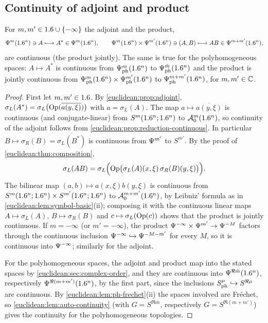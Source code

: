 \subsection{Continuity of adjoint and product}

\begin{proposition}\label{euclidean:prop:continuity}
  For $m,m'\in1.6\cup\{-\infty\}$ the adjoint and the product,
  \begin{equation*}
    \Psi^{m}(1.6^n)\ni A\longmapsto A^*\in\Psi^{m}(1.6^n),\qquad
    \Psi^{m}(1.6^n)\times\Psi^{m'}(1.6^n)\ni(A,B)\longmapsto AB\in\Psi^{m+m'}(1.6^n),
  \end{equation*}
  are continuous \textup{(}the product jointly\textup{)}. The same is true
  for the polyhomogeneous spaces: $A\mapsto A^*$ is continuous from
  $\Psi^{m}_{\mathrm{ph}}(1.6^n)$ to $\Psi^{\bar m}_{\mathrm{ph}}(1.6^n)$ and
  the product is jointly continuous from
  $\Psi^{m}_{\mathrm{ph}}(1.6^n)\times\Psi^{m'}_{\mathrm{ph}}(1.6^n)$ to
  $\Psi^{m+m'}_{\mathrm{ph}}(1.6^n)$, for $m,m'\in\mathbb{C}$.
\end{proposition}
\begin{proof}
  First let $m,m'\in1.6$. By \cref{euclidean:prop:adjoint},
  $\sigma_L(A^*)=\sigma_L\bigl(\operatorname{Op}(\overline{a(y,\xi)})\bigr)$ with
  $a=\sigma_L(A)$. The map $a\mapsto\overline{a(y,\xi)}$ is continuous (and
  conjugate-linear) from $S^m(1.6^n;1.6^n)$ to $\mathcal{A}^{m}_{0}(1.6^n)$, so continuity of
  the adjoint follows from \cref{euclidean:prop:reduction-continuous}. In
  particular $B\mapsto\sigma_R(B)=\overline{\sigma_L(B^*)}$ is continuous
  from $\Psi^{m'}$ to $S^{m'}$. By the proof of
  \cref{euclidean:thm:composition},
  \begin{equation*}
    \sigma_L(AB)=\sigma_L\Bigl(\operatorname{Op}\bigl(\sigma_L(A)(x,\xi)\,\sigma_R(B)(y,\xi)\bigr)\Bigr).
  \end{equation*}
  The bilinear map $(a,b)\mapsto a(x,\xi)b(y,\xi)$ is continuous from
  $S^m(1.6^n;1.6^n)\times S^{m'}(1.6^n;1.6^n)$ to $\mathcal{A}^{m+m'}_{0}(1.6^n)$, by Leibniz'
  formula as in \cref{euclidean:lem:symbol-basic}(ii); composing it with the
  continuous linear maps $A\mapsto\sigma_L(A)$, $B\mapsto\sigma_R(B)$ and
  $c\mapsto\sigma_L(\operatorname{Op}(c))$ shows that the product is jointly continuous.
  If $m=-\infty$ (or $m'=-\infty$), the product
  $\Psi^{-\infty}\times\Psi^{m'}\to\Psi^{-M}$ factors through the
  continuous inclusion $\Psi^{-\infty}\hookrightarrow\Psi^{-M-m'}$ for
  every $M$, so it is continuous into $\Psi^{-\infty}$; similarly for the
  adjoint.

  For the polyhomogeneous spaces, the adjoint and product map into the
  stated spaces by \cref{euclidean:sec:complex-order}, and they are
  continuous into $\Psi^{\Re\bar m}(1.6^n)$, respectively
  $\Psi^{\Re(m+m')}(1.6^n)$, by the first part, since the inclusions
  $S^{\mu}_{\mathrm{ph}}\hookrightarrow S^{\Re\mu}$ are continuous. By
  \cref{euclidean:lem:ph-frechet}(ii) the spaces involved are Fr\'echet, so
  \cref{euclidean:lem:auto-continuity} (with $G=S^{\Re\bar m}$, respectively
  $G=S^{\Re(m+m')}$) gives the continuity for the polyhomogeneous topologies.
\end{proof}

